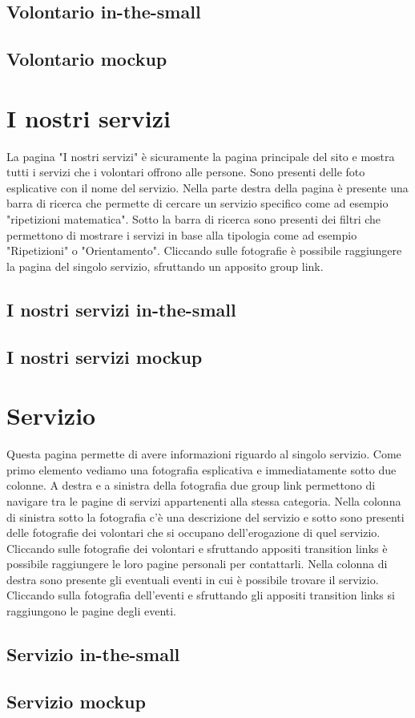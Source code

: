         \subsection{Volontario in-the-small}

        \subsection{Volontario mockup}

    \section{I nostri servizi}
    La pagina "I nostri servizi" è sicuramente la pagina principale del sito e
    mostra tutti i servizi che i volontari offrono alle persone. Sono presenti
    delle foto esplicative con il nome del servizio. Nella parte destra della
    pagina è presente una barra di ricerca che permette di cercare un servizio
    specifico come ad esempio "ripetizioni matematica". Sotto la barra di
    ricerca sono presenti dei filtri che permettono di mostrare i servizi in
    base alla tipologia come ad esempio "Ripetizioni" o "Orientamento".
    Cliccando sulle fotografie è possibile raggiungere la pagina del singolo
    servizio, sfruttando un apposito group link.
        \subsection{I nostri servizi in-the-small} 

        \subsection{I nostri servizi mockup}
    
    \section{Servizio}    
    Questa pagina permette di avere informazioni riguardo al singolo servizio.
    Come primo elemento vediamo una fotografia esplicativa e immediatamente
    sotto due colonne. A destra e a sinistra della fotografia due group link
    permettono di navigare tra le pagine di servizi appartenenti alla stessa
    categoria. Nella colonna di sinistra sotto la fotografia c'è una descrizione
    del servizio e sotto sono presenti delle fotografie dei volontari che si
    occupano dell'erogazione di quel servizio. Cliccando sulle fotografie dei
    volontari e sfruttando appositi transition links è possibile raggiungere le
    loro pagine personali per contattarli. Nella colonna di destra sono presente
    gli eventuali eventi in cui è possibile trovare il servizio. Cliccando sulla
    fotografia dell'eventi e sfruttando gli appositi transition links si
    raggiungono le pagine degli eventi.
        \subsection{Servizio in-the-small}
        \subsection{Servizio mockup}
    